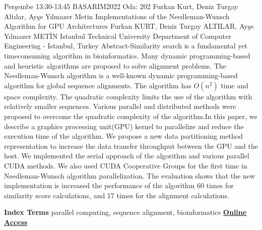 
    \begin{abstract_basarim}
    {Perşembe 13:30-13:45}
    {BASARIM2022}
    {Oda: 202}
    {Furkan Kurt, Deniz Turgay Altılar, Ayşe Yılmazer Metin}
    {Implementations of the Needleman-Wunsch Algorithm for GPU Architectures}
    {%
    Furkan KURT, Deniz Turgay ALTILAR, Ayşe Yılmazer METİN}
    {%
    }
    {%
    Istanbul Technical University Department of Computer Engineering - Istanbul, Turkey}
    Abstract-Similarity search is a fundamental yet timeconsuming algorithm in bioinformatics. Many dynamic programming-based and heuristic algorithms are proposed to solve alignment problems. The Needleman-Wunsch algorithm is a well-known dynamic programming-based algorithm for global sequence alignments. The algorithm has $O\left(n^{2}\right)$ time and space complexity. The quadratic complexity limits the use of the algorithm with relatively smaller sequences. Various parallel and distributed methods were proposed to overcome the quadratic complexity of the algorithm.\newline In this paper, we describe a graphics processing unit(GPU) kernel to parallelize and reduce the execution time of the algorithm. We propose a new data partitioning method representation to increase the data transfer throughput between the GPU and the host. We implemented the serial approach of the algorithm and various parallel CUDA methods. We also used CUDA Cooperative Groups for the first time in Needleman-Wunsch algorithm parallelization. The evaluation shows that the new implementation is increased the performance of the algorithm 60 times for similarity score calculations, and 17 times for the alignment calculations. 
    
            \textbf{Index Terms} \newline{}parallel computing, sequence alignment, bioinformatics
     \newline\newline\noindent \href{https://drive.google.com/file/d/1oPFwlb9nyBeN2SLv5RJ7jUYcpjFTPqsG/view?usp=drivesdk}{\bfseries Online Access}
    \end{abstract_basarim}
    